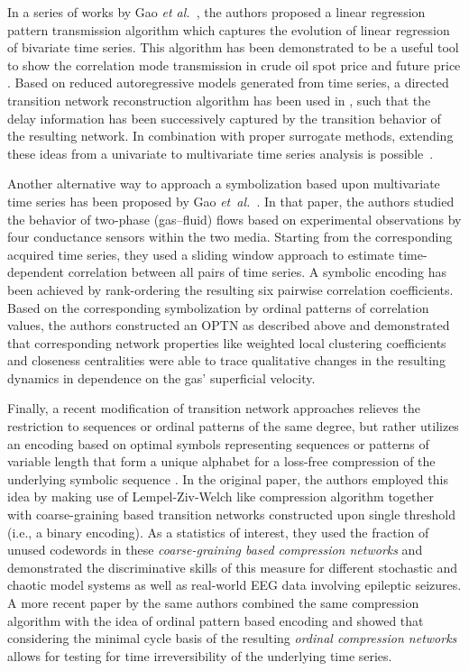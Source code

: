 		In a series of works by Gao \textit{et al.}~\cite{Gao2014a,Gao2014,Gao2015}, the authors proposed a linear regression pattern transmission algorithm which captures the evolution of linear regression of bivariate time series. This algorithm has been demonstrated to be a useful tool to show the correlation mode transmission in crude oil spot price and future price \cite{Huang2015}. Based on reduced autoregressive models generated from time series, a directed transition network reconstruction algorithm has been used in \cite{Nakamura2012a}, such that the delay information has been successively captured by the transition behavior of the resulting network. In combination with proper surrogate methods, extending these ideas from a univariate to multivariate time series analysis is possible~\cite{Nakamura2016}. 
		
        Another alternative way to approach a symbolization based upon multivariate time series has been proposed by Gao \emph{et~al.}~\cite{Gao2015b}. In that paper, the authors studied the behavior of two-phase (gas--fluid) flows based on experimental observations by four conductance sensors within the two media. Starting from the corresponding acquired time series, they used a sliding window approach to estimate time-dependent correlation between all pairs of time series. A symbolic encoding has been achieved by rank-ordering the resulting six pairwise correlation coefficients. Based on the corresponding symbolization by ordinal patterns of correlation values, the authors constructed an OPTN as described above and demonstrated that corresponding network properties like weighted local clustering coefficients and closeness centralities were able to trace qualitative changes in the resulting dynamics in dependence on the gas' superficial velocity.
		
        Finally, a recent modification of transition network approaches relieves the restriction to sequences or ordinal patterns of the same degree, but rather utilizes an encoding based on optimal symbols representing sequences or patterns of variable length that form a unique alphabet for a loss-free compression of the underlying symbolic sequence \cite{Walker2018}. In the original paper, the authors employed this idea by making use of Lempel-Ziv-Welch like compression algorithm \cite{Welch1984} together with coarse-graining based transition networks constructed upon single threshold (i.e., a binary encoding). As a statistics of interest, they used the fraction of unused codewords in these \emph{coarse-graining based compression networks} and demonstrated the discriminative skills of this measure for different stochastic and chaotic model systems as well as real-world EEG data involving epileptic seizures. A more recent paper by the same authors combined the same compression algorithm with the idea of ordinal pattern based encoding and showed that considering the minimal cycle basis of the resulting \emph{ordinal compression networks} allows for testing for time irreversibility of the underlying time series.
        
